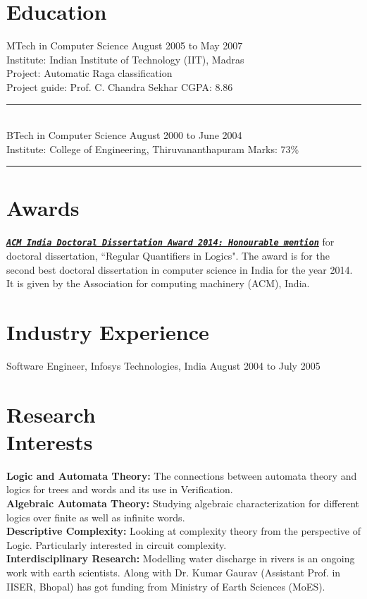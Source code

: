 \documentclass[margin]{res}
\begin{document}
\begin{resume}
\section{Education} 
					MTech in Computer Science \hfill August 2005 to May 2007\\
					Institute: Indian Institute of Technology (IIT), Madras \\
					Project: Automatic Raga classification \\
					Project guide: Prof. C. Chandra Sekhar \hfill CGPA: 8.86 \\
					\noindent\rule{13cm}{0.4pt} \\
					BTech in Computer Science \hfill August 2000 to June 2004 \\
					Institute: College of Engineering, Thiruvananthapuram \hfill Marks: 73\% \\
					\noindent\rule{13cm}{0.4pt} 

\section{Awards}
\href{http://awards.acm.org/award_winners/sreejith_9923861.cfm}{\tt{\emph{\bf ACM India Doctoral Dissertation Award 2014: Honourable mention}}} for doctoral dissertation, ``Regular Quantifiers in Logics". The award is for the second best doctoral dissertation in computer science in India for the year 2014. It is given by the Association for computing machinery (ACM), India.
	

\section{Industry Experience}
Software Engineer, Infosys Technologies, India \hfill August 2004 to July 2005
				
\section{Research \\ Interests} 
{\bf Logic and Automata Theory:} The connections between automata theory and logics for trees and words and its use in Verification. \\
{\bf Algebraic Automata Theory:} Studying algebraic characterization for different logics over finite as well as infinite words. \\
{\bf Descriptive Complexity:} Looking at complexity theory from the perspective of Logic. Particularly interested in circuit complexity. \\
{\bf Interdisciplinary Research:} Modelling water discharge in rivers is an ongoing work with earth scientists. Along with Dr. Kumar Gaurav (Assistant Prof. in IISER, Bhopal) has got funding from Ministry of Earth Sciences (MoES).


\end{resume}
\end{document}
